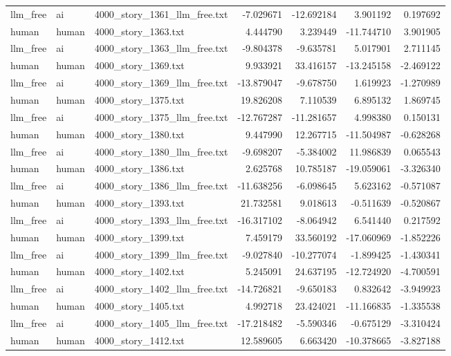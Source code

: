 \begin{longtable}{lllrrrr}
llm\_free & ai & 4000\_story\_1361\_llm\_free.txt & -7.029671 & -12.692184 & 3.901192 & 0.197692 \\
human & human & 4000\_story\_1363.txt & 4.444790 & 3.239449 & -11.744710 & 3.901905 \\
llm\_free & ai & 4000\_story\_1363\_llm\_free.txt & -9.804378 & -9.635781 & 5.017901 & 2.711145 \\
human & human & 4000\_story\_1369.txt & 9.933921 & 33.416157 & -13.245158 & -2.469122 \\
llm\_free & ai & 4000\_story\_1369\_llm\_free.txt & -13.879047 & -9.678750 & 1.619923 & -1.270989 \\
human & human & 4000\_story\_1375.txt & 19.826208 & 7.110539 & 6.895132 & 1.869745 \\
llm\_free & ai & 4000\_story\_1375\_llm\_free.txt & -12.767287 & -11.281657 & 4.998380 & 0.150131 \\
human & human & 4000\_story\_1380.txt & 9.447990 & 12.267715 & -11.504987 & -0.628268 \\
llm\_free & ai & 4000\_story\_1380\_llm\_free.txt & -9.698207 & -5.384002 & 11.986839 & 0.065543 \\
human & human & 4000\_story\_1386.txt & 2.625768 & 10.785187 & -19.059061 & -3.326340 \\
llm\_free & ai & 4000\_story\_1386\_llm\_free.txt & -11.638256 & -6.098645 & 5.623162 & -0.571087 \\
human & human & 4000\_story\_1393.txt & 21.732581 & 9.018613 & -0.511639 & -0.520867 \\
llm\_free & ai & 4000\_story\_1393\_llm\_free.txt & -16.317102 & -8.064942 & 6.541440 & 0.217592 \\
human & human & 4000\_story\_1399.txt & 7.459179 & 33.560192 & -17.060969 & -1.852226 \\
llm\_free & ai & 4000\_story\_1399\_llm\_free.txt & -9.027840 & -10.277074 & -1.899425 & -1.430341 \\
human & human & 4000\_story\_1402.txt & 5.245091 & 24.637195 & -12.724920 & -4.700591 \\
llm\_free & ai & 4000\_story\_1402\_llm\_free.txt & -14.726821 & -9.650183 & 0.832642 & -3.949923 \\
human & human & 4000\_story\_1405.txt & 4.992718 & 23.424021 & -11.166835 & -1.335538 \\
llm\_free & ai & 4000\_story\_1405\_llm\_free.txt & -17.218482 & -5.590346 & -0.675129 & -3.310424 \\
human & human & 4000\_story\_1412.txt & 12.589605 & 6.663420 & -10.378665 & -3.827188 \\

\end{longtable}
